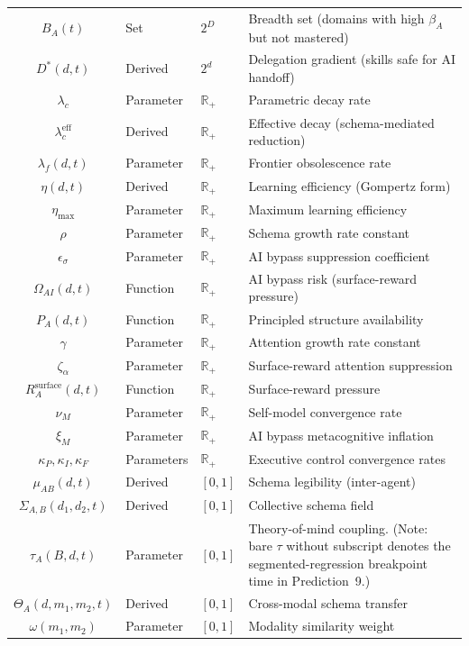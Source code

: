\documentclass[11pt,a4paper]{article}
\newcommand{\R}{\mathbb{R}}
\begin{document}
\begin{center}
{\begin{tabular}{c l l l}
$B_A(t)$ & Set & $2^D$ & Breadth set (domains with high $\beta_A$ but not mastered) \\
$D^*(d,t)$ & Derived & $2^d$ & Delegation gradient (skills safe for AI handoff) \\
$\lambda_c$ & Parameter & $\R_+$ & Parametric decay rate \\
$\lambda_c^{\text{eff}}$ & Derived & $\R_+$ & Effective decay (schema-mediated reduction) \\
$\lambda_f(d,t)$ & Parameter & $\R_+$ & Frontier obsolescence rate \\
$\eta(d,t)$ & Derived & $\R_+$ & Learning efficiency (Gompertz form) \\
$\eta_{\max}$ & Parameter & $\R_+$ & Maximum learning efficiency \\
$\rho$ & Parameter & $\R_+$ & Schema growth rate constant \\
$\epsilon_\sigma$ & Parameter & $\R_+$ & AI bypass suppression coefficient \\
$\Omega_{AI}(d,t)$ & Function & $\R_+$ & AI bypass risk (surface-reward pressure) \\
$P_A(d,t)$ & Function & $\R_+$ & Principled structure availability \\
$\gamma$ & Parameter & $\R_+$ & Attention growth rate constant \\
$\zeta_\alpha$ & Parameter & $\R_+$ & Surface-reward attention suppression \\
$R_A^{\text{surface}}(d,t)$ & Function & $\R_+$ & Surface-reward pressure \\
$\nu_M$ & Parameter & $\R_+$ & Self-model convergence rate \\
$\xi_M$ & Parameter & $\R_+$ & AI bypass metacognitive inflation \\
$\kappa_P, \kappa_I, \kappa_F$ & Parameters & $\R_+$ & Executive control convergence rates \\
$\mu_{AB}(d,t)$ & Derived & $[0,1]$ & Schema legibility (inter-agent) \\
$\Sigma_{A,B}(d_1,d_2,t)$ & Derived & $[0,1]$ & Collective schema field \\
$\tau_A(B,d,t)$ & Parameter & $[0,1]$ & Theory-of-mind coupling.  (Note: bare $\tau$ without subscript denotes the segmented-regression breakpoint time in Prediction~9.) \\
$\Theta_A(d,m_1,m_2,t)$ & Derived & $[0,1]$ & Cross-modal schema transfer \\
$\omega(m_1,m_2)$ & Parameter & $[0,1]$ & Modality similarity weight \\

\end{tabular}}
\end{center}
\end{document}
